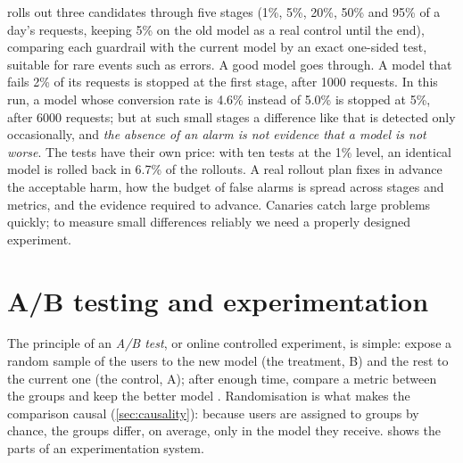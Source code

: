  rolls out three candidates through five stages (1\%, 5\%, 20\%, 50\% and 95\% of a day's requests,
keeping 5\% on the old model as a real control until the end), comparing each guardrail with the current model by
an exact one-sided test, suitable for rare events such as errors. A good model goes through. A model that fails 2\%
of its requests is stopped at the first stage, after 1000 requests. In this run, a model whose conversion rate is 4.6\%
instead of 5.0\% is stopped at 5\%, after 6000 requests; but at such small stages a difference like that is detected
only occasionally, and \emph{the absence of an alarm is not evidence that a model is not worse}. The tests have their own
price: with ten tests at the 1\% level, an identical model is rolled back in 6.7\% of the rollouts. A real rollout plan
fixes in advance the acceptable harm, how the budget of false alarms is spread across stages and metrics, and the
evidence required to advance. Canaries catch large problems quickly; to measure small differences reliably we need
a properly designed experiment.

\section{A/B testing and experimentation}\label{sec:abtesting}

The principle of an \emph{A/B test}, or online controlled experiment, is simple: expose a random sample of the users to the new
model (the treatment, B) and the rest to the current one (the control, A); after enough time, compare a metric between the groups
and keep the better model \citep{kohavi2009controlled,kohavi2020trustworthy}. Randomisation is what makes the comparison causal
(\cref{sec:causality}): because users are assigned to groups by chance, the groups differ, on average, only in the model they
receive.  shows the parts of an experimentation system.

